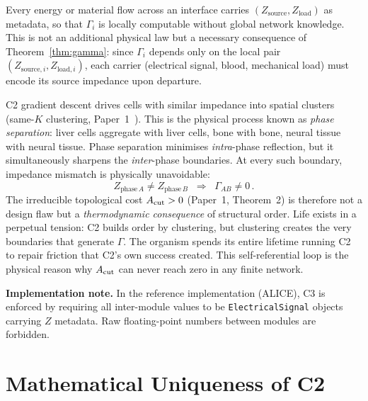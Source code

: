 \documentclass[aps,pre,twocolumn,superscriptaddress,floatfix]{revtex4-2}
\begin{document}
\begin{remark}
Every energy or material flow across an interface
carries $(Z_{\text{source}}, Z_{\text{load}})$ as
metadata, so that $\Gamma_i$ is locally computable
without global network knowledge.
This is not an additional physical law but a
necessary consequence of Theorem~\ref{thm:gamma}:
since $\Gamma_i$ depends only on the local pair
$(Z_{\text{source},i}, Z_{\text{load},i})$,
each carrier (electrical signal, blood, mechanical
load) must encode its source impedance upon
departure.
\end{remark}

\begin{remark}
\label{rem:phase-separation}
C2 gradient descent drives cells with similar impedance
into spatial clusters (same-$K$ clustering,
Paper~1~\cite{Paper1}).
This is the physical process known as
\emph{phase separation}: liver cells aggregate with
liver cells, bone with bone, neural tissue with
neural tissue.
Phase separation minimises \emph{intra}-phase
reflection, but it simultaneously sharpens the
\emph{inter}-phase boundaries.
At every such boundary, impedance mismatch is
physically unavoidable:
\[
  Z_{\text{phase}\,A} \neq Z_{\text{phase}\,B}
  \;\;\Longrightarrow\;\;
  \Gamma_{AB} \neq 0\,.
\]
The irreducible topological cost
$A_{\text{cut}} > 0$ (Paper~1, Theorem~2) is therefore not
a design flaw but a \emph{thermodynamic consequence}
of structural order.
Life exists in a perpetual tension:
C2 builds order by clustering, but clustering
creates the very boundaries that generate $\Gamma$.
The organism spends its entire lifetime running C2
to repair friction that C2's own success created.
This self-referential loop is the physical reason
why $A_{\text{cut}}$ can never reach zero in any
finite network.
\end{remark}

\medskip\noindent
\textbf{Implementation note.}
In the reference implementation (ALICE), C3 is enforced
by requiring all inter-module values to be
\texttt{ElectricalSignal} objects carrying $Z$ metadata.
Raw floating-point numbers between modules are forbidden.


\section{Mathematical Uniqueness of C2}
\label{sec:uniqueness}
\end{document}
